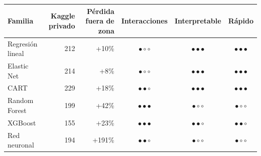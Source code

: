 \begin{tabular}{lrrccc}
\toprule
Familia & Kaggle privado & Pérdida fuera de zona & Interacciones & Interpretable & Rápido \\
\midrule
Regresión lineal & 212 & +10\% & $\bullet\circ\circ$ & $\bullet\bullet\bullet$ & $\bullet\bullet\bullet$ \\
Elastic Net & 214 & +8\% & $\bullet\circ\circ$ & $\bullet\bullet\bullet$ & $\bullet\bullet\bullet$ \\
CART & 229 & +18\% & $\bullet\bullet\circ$ & $\bullet\bullet\bullet$ & $\bullet\bullet\bullet$ \\
Random Forest & 199 & +42\% & $\bullet\bullet\bullet$ & $\bullet\circ\circ$ & $\bullet\circ\circ$ \\
XGBoost & 155 & +23\% & $\bullet\bullet\bullet$ & $\bullet\bullet\circ$ & $\bullet\bullet\circ$ \\
Red neuronal & 194 & +191\% & $\bullet\bullet\circ$ & $\bullet\circ\circ$ & $\bullet\circ\circ$ \\
\bottomrule
\end{tabular}
